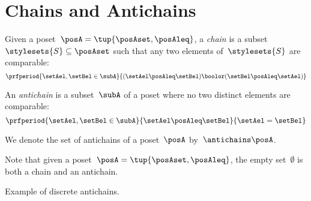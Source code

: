 
\section{Chains and Antichains}
\label{sec:chains-antichains}
\begin{definition}
    \label{def:chain}
    Given a poset~$\posA = \tup{\posAset, \posAleq}$, a \emph{chain} is a subset~$\stylesets{S} \subseteq \posAset$ such that any two elements of~$\stylesets{S}$ are comparable:
    \begin{equation}
        \prfperiod{
            \setAel,\setBel \in \subA
        }{
            (\setAel \posAleq  \setBel) \boolor (\setBel \posAleq  \setAel)
        }
    \end{equation}
\end{definition}

\begin{definition}
    \label{def:antichain}
    An \emph{antichain} is a subset~$\subA$ of a poset where no two distinct elements are comparable:
    \begin{equation}
        \prfperiod{
            \setAel,\setBel \in \subA
        }{
            \setAel \posAleq \setBel
        }{
            \setAel = \setBel
        }
    \end{equation}
\end{definition}

We denote the set of antichains of a poset~$\posA$ by~$\antichains\posA$.

\begin{remark}
    Note that given a poset~$\posA=\tup{\posAset,\posAleq}$, the empty set~$\emptyset$ is both a chain and an antichain.
\end{remark}

\begin{marginfigure}
    \centering
    \caption{Example of discrete antichains.}
    \label{fig:antichain}
\end{marginfigure}

